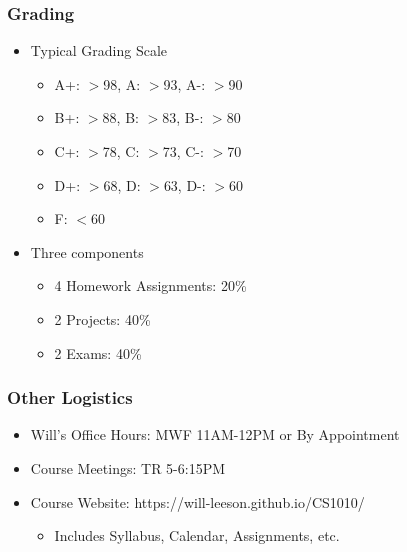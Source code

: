 \documentclass{beamer}
\begin{document}
\begin{frame}
    \frametitle{Grading}

    \begin{itemize}
        \item Typical Grading Scale
        \begin{itemize}
            \item A+: $>$98, A: $>$93, A-: $>$90
            \item B+: $>$88, B: $>$83, B-: $>$80
            \item C+: $>$78, C: $>$73, C-: $>$70
            \item D+: $>$68, D: $>$63, D-: $>$60
            \item F:  $<$60
        \end{itemize}
        \item Three components
        \begin{itemize}
            \item 4 Homework Assignments: 20\%
            \item 2 Projects: 40\%
            \item 2 Exams: 40\%
        \end{itemize}
    \end{itemize}
\end{frame}

\begin{frame}
    \frametitle{Other Logistics}

    \begin{itemize}
        \item Will's Office Hours: MWF 11AM-12PM or By Appointment
        \item Course Meetings: TR 5-6:15PM
        \item Course Website: https://will-leeson.github.io/CS1010/
        \begin{itemize}
            \item Includes Syllabus, Calendar, Assignments, etc.
        \end{itemize}
    \end{itemize}    
\end{frame}
\end{document}
